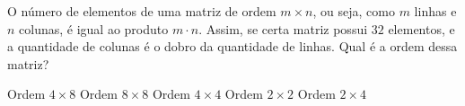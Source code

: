 O número de elementos de uma matriz de ordem $m\times n$, ou seja, como $m$ linhas e $n$ colunas, é igual ao produto $m\cdot n$. Assim, se certa matriz possui $32$ elementos, e a quantidade de colunas é o dobro da quantidade de linhas. Qual é a ordem dessa matriz?

Ordem $4\times 8$
Ordem $8\times 8$
Ordem $4\times 4$
Ordem $2\times 2$
Ordem $2\times 4$


